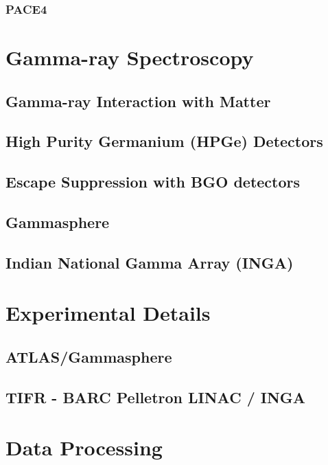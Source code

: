 \subsubsection{PACE4}
\label{sssec:exp-pr-fus-evap-beam-pace4}

\section{Gamma-ray Spectroscopy}
\label{sec:exp-pr-gamma-spec}
\subsection{Gamma-ray Interaction with Matter}
\label{ssec:exp-pr-gamma-spec-interactions}
\subsection{High Purity Germanium (HPGe) Detectors}
\label{ssec:exp-pr-gamma-spec-hpge}
\subsection{Escape Suppression with BGO detectors}
\label{ssec:exp-pr-gamma-spec-escape-supress}
\subsection{Gammasphere}
\label{ssec:exp-pr-gamma-gammasphere}
\subsection{Indian National Gamma Array (INGA)}
\label{ssec:exp-pr-gamma-spec-inga}

\section{Experimental Details}
\label{sec:exp-pr-details}
\subsection{ATLAS/Gammasphere}
\label{ssec:exp-pr-details-gs}
\subsection{TIFR - BARC Pelletron LINAC / INGA}
\label{ssec:exp-pr-details-inga}

\section{Data Processing}
\label{sec:exp-pr-data-proc}
